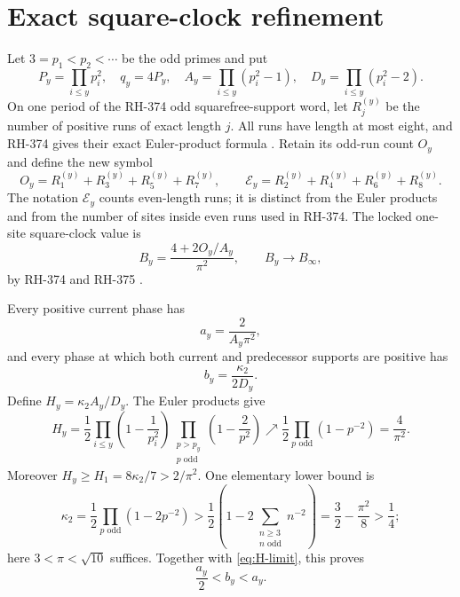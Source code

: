 \documentclass[11pt]{article}
\theoremstyle{definition}
\theoremstyle{remark}
\newcommand{\kap}{\kappa_2}
\newcommand{\Ecal}{\mathcal E}
\begin{document}
\section{Exact square-clock refinement}

Let $3=p_1<p_2<\cdots$ be the odd primes and put
\begin{equation}
 P_y=\prod_{i\le y}p_i^2,
 \quad q_y=4P_y,
 \quad A_y=\prod_{i\le y}(p_i^2-1),
 \quad D_y=\prod_{i\le y}(p_i^2-2).
 \label{eq:square-parameters}
\end{equation}
On one period of the RH-374 odd squarefree-support word, let $R_j^{(y)}$ be
the number of positive runs of exact length $j$.  All runs have length at
most eight, and RH-374 gives their exact Euler-product formula
\cite{RH374}.  Retain its odd-run count $O_y$ and define the new symbol
\begin{equation}
 O_y=R_1^{(y)}+R_3^{(y)}+R_5^{(y)}+R_7^{(y)},
 \qquad
 \Ecal_y=R_2^{(y)}+R_4^{(y)}+R_6^{(y)}+R_8^{(y)}.
 \label{eq:run-counts}
\end{equation}
The notation $\Ecal_y$ counts even-length runs; it is distinct from the
Euler products and from the number of sites inside even runs used in
RH-374.
The locked one-site square-clock value is
\begin{equation}
                 B_y=\frac{4+2O_y/A_y}{\pi^2},
                 \qquad B_y\longrightarrow B_\infty,
 \label{eq:B-y}
\end{equation}
by RH-374 and RH-375 \cite{RH374,RH375}.

Every positive current phase has
\begin{equation}
             a_y=\frac{2}{A_y\pi^2},
 \label{eq:a-weight}
\end{equation}
and every phase at which both current and predecessor supports are positive
has
\begin{equation}
             b_y=\frac{\kap}{2D_y}.
 \label{eq:b-weight}
\end{equation}
Define $H_y=\kap A_y/D_y$.  The Euler products give
\begin{equation}
 H_y=\frac12
 \prod_{i\le y}\left(1-\frac1{p_i^2}\right)
 \prod_{\substack{p>p_y\\p\text{ odd}}}
        \left(1-\frac2{p^2}\right)
 \nearrow \frac12\prod_{p\text{ odd}}(1-p^{-2})=\frac4{\pi^2}.
 \label{eq:H-limit}
\end{equation}
Moreover $H_y\ge H_1=8\kap/7>2/\pi^2$.  One elementary lower bound is
\[
 \kap=\frac12\prod_{p\text{ odd}}(1-2p^{-2})
 >\frac12\left(1-2\sum_{\substack{n\ge3\\n\text{ odd}}}n^{-2}\right)
 =\frac32-\frac{\pi^2}{8}>\frac14;
\]
here $3<\pi<\sqrt{10}$ suffices.  Together with
\eqref{eq:H-limit}, this proves
\begin{equation}
                         \frac{a_y}{2}<b_y<a_y.
 \label{eq:a-b-order}
\end{equation}
\end{document}
